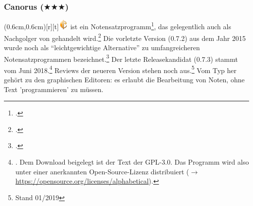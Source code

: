 %
%
%



\subsubsection{Canorus ($\bigstar\bigstar\bigstar$)}

\parpic(0.6cm,0.6cm)[r][t]{\includegraphics[width=0.5cm]{logos/canorus-300dpi.png}}
\label{Canorus} ist ein Notensatzprogramm\footcite[vgl.][\nopage
wp]{Canorus2019a}, das gelegentlich auch als Nachgolger von 
gehandelt wird.\footcite[vgl.][\nopage wp]{WpedCanorus2019a} Die vorletzte
Version (0.7.2) aus dem Jahr 2015 wurde noch als \enquote{leichtgewichtige
Alternative} zu umfangreicheren Notensatzprogrammen
bezeichnet.\footcite[vgl.][\nopage wp]{Kreussel2015a} Der letzte Releasekandidat
(0.7.3) stammt vom Juni 2018.\footnote{\cite[vgl.][\nopage wp]{Canorus2019b}.
Dem Download beigelegt ist der Text der GPL-3.0. Das Programm wird also unter
einer anerkannten Open-Source-Lizenz distribuiert ($\rightarrow$
\href{https://opensource.org/licenses/alphabetical}
{https://opensource.org/licenses/alphabetical}). } Reviews der neueren Version
stehen noch aus.\footnote{Stand 01/2019} Vom Typ her gehört  zu den
graphischen Editoren: es erlaubt die Bearbeitung von Noten, ohne Text
'programmieren' zu müssen.


